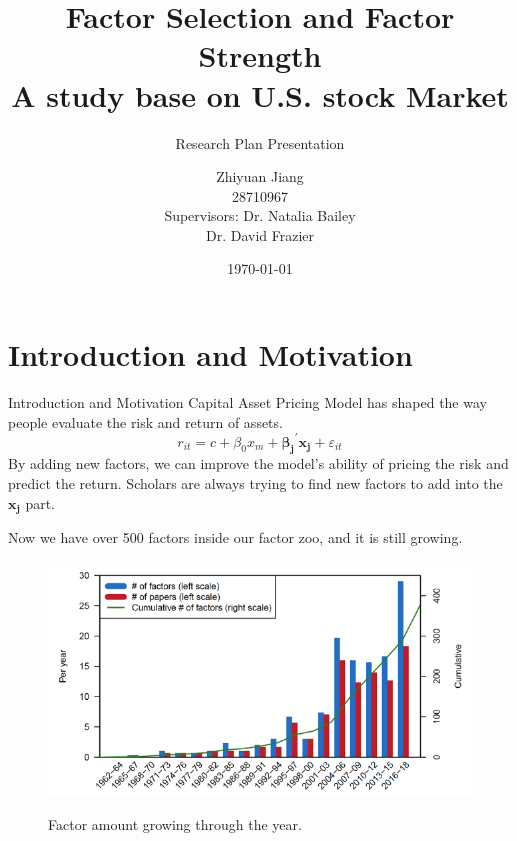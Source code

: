 \documentclass[12pt]{beamer}
\title{Factor Selection and Factor Strength\\
A study base on U.S. stock Market}
\subtitle{Research Plan Presentation}
\date{\today}
\author[author]{Zhiyuan Jiang\\
			28710967\\[10mm]{\small Supervisors: Dr. Natalia Bailey \\ \hspace{18mm} Dr. David Frazier}}
\begin{document}
	
\frame[plain]{\titlepage}

\section{Introduction and Motivation}
\begin{frame}{Introduction and Motivation}
Capital Asset Pricing Model has shaped the way people evaluate the risk and return of assets.
  \[   r_{it} = c + \beta_0 x_m + \mathbf{\beta_j}^{\prime}\mathbf{x_j} + \varepsilon_{it}  \tag{1}\label{2CAPM} \]
By adding new factors, we can improve the model's ability of pricing the risk and predict the return.
 Scholars are always trying to find new factors to add into the $\mathbf{x_j}$  part.
   
   Now we have over 500 factors inside our factor zoo, and it is still growing. \cite{Harvey2019}
\end{frame}
\begin{frame}[plain]
	\begin{figure}
\includegraphics[scale = 0.5]{figure/factor_growth.png}
\caption{Factor amount growing through the year. }
	\cite{Harvey2017}
	\end{figure}
\end{frame}
\end{document}
